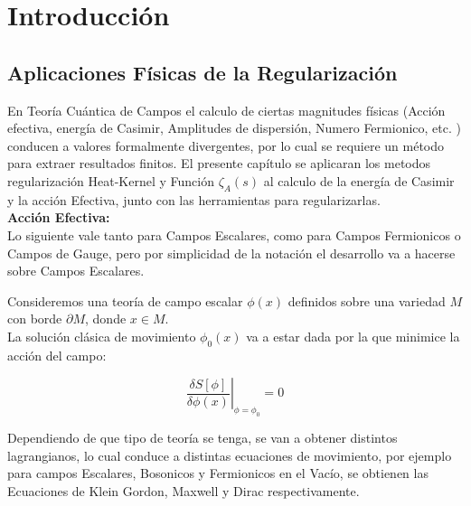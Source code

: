 \chapter{Introducción}


\section{ Aplicaciones Físicas de la Regularización }

En Teoría Cuántica de Campos el calculo de ciertas magnitudes físicas (Acción efectiva, energía de Casimir, Amplitudes de dispersión, Numero Fermionico, etc. ) conducen a valores formalmente divergentes, por lo cual se requiere un método para extraer resultados finitos. El presente capítulo se aplicaran los metodos regularización Heat-Kernel y Función $ \zeta _A (s) $ al calculo de la energía de Casimir y la acción Efectiva, junto con las herramientas para regularizarlas.\\





\textbf{Acción Efectiva:}\\

Lo siguiente vale tanto para Campos Escalares, como para Campos Fermionicos o Campos de Gauge, pero por simplicidad de la notación el desarrollo va a hacerse sobre Campos Escalares.

Consideremos una teoría de campo escalar $\phi(x)$ definidos sobre una variedad $M$ con borde $\partial M$, donde $x \in  M$. \\

La solución clásica de movimiento $ \phi _0 (x) $ va a estar dada por la que minimice la acción del campo:

\begin{equation}
\left. \frac{\delta S [ \phi ] }{\delta \phi (x)}  \right| _{\phi = \phi _0  } = 0
\end{equation}


Dependiendo de que tipo de teoría se tenga, se van a obtener distintos lagrangianos, lo cual conduce a distintas ecuaciones de movimiento, por ejemplo para campos Escalares, Bosonicos y Fermionicos en el Vacío, se obtienen las Ecuaciones de Klein Gordon, Maxwell y Dirac respectivamente.

